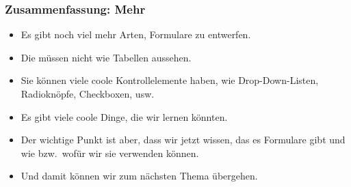 \documentclass[aspectratio=169,mathserif,notheorems]{beamer}%
\begin{document}
%
\begin{frame}%
\frametitle{Zusammenfassung: Mehr}%
\begin{itemize}%
\item Es gibt noch viel mehr Arten, Formulare zu entwerfen.%
\item<2-> Die müssen nicht wie Tabellen aussehen.%
\item<3-> Sie können viele coole Kontrollelemente haben, wie Drop-Down-Listen, Radioknöpfe, Checkboxen, usw.%
\item<4-> Es gibt viele coole Dinge, die wir lernen könnten.%
\item<5-> Der wichtige Punkt ist aber, dass wir jetzt wissen, das es Formulare gibt und wie bzw.\ wofür wir sie verwenden können.%
\item<6-> Und damit können wir zum nächsten Thema übergehen.%
\end{itemize}%
\end{frame}%
\endPresentation%
\end{document}
